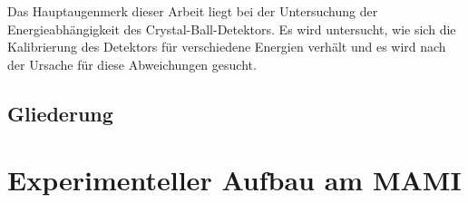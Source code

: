 \documentclass[a4paper,11pt,oneside,final,german,openbib,pdftex]{scrbook}
\begin{document}
{Das Hauptaugenmerk dieser Arbeit liegt bei der Untersuchung der Energieabh\"angigkeit des Crystal-Ball-Detektors. Es wird untersucht, wie sich die Kalibrierung des Detektors f\"ur verschiedene Energien verh\"alt und es wird nach der Ursache f\"ur diese Abweichungen gesucht. 
\newline	 
	
	
\section{Gliederung}






\chapter{Experimenteller Aufbau am MAMI}





}
\end{document}
